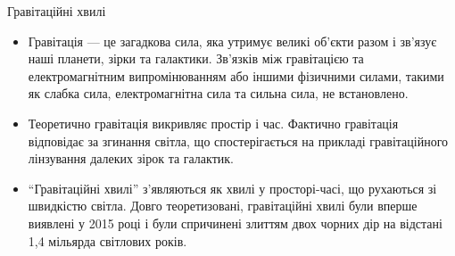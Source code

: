 {\white

{\Large Гравітаційні хвилі}

\begin{itemize}

\item Гравітація --- це загадкова сила, яка утримує великі об'єкти разом і зв'язує наші планети, зірки та галактики. Зв'язків між гравітацією та електромагнітним випромінюванням або іншими фізичними силами, такими як слабка сила, електромагнітна сила та сильна сила, не встановлено.

\item Теоретично гравітація викривляє простір і час. Фактично гравітація відповідає за згинання світла, що спостерігається на прикладі гравітаційного лінзування далеких зірок та галактик.

\item ``Гравітаційні хвилі'' з'являються як хвилі у просторі-часі, що рухаються зі швидкістю світла. Довго теоретизовані, гравітаційні хвилі були вперше виявлені у 2015 році і були спричинені злиттям двох чорних дір на відстані 1,4 мільярда світлових років.

\end{itemize}
}

